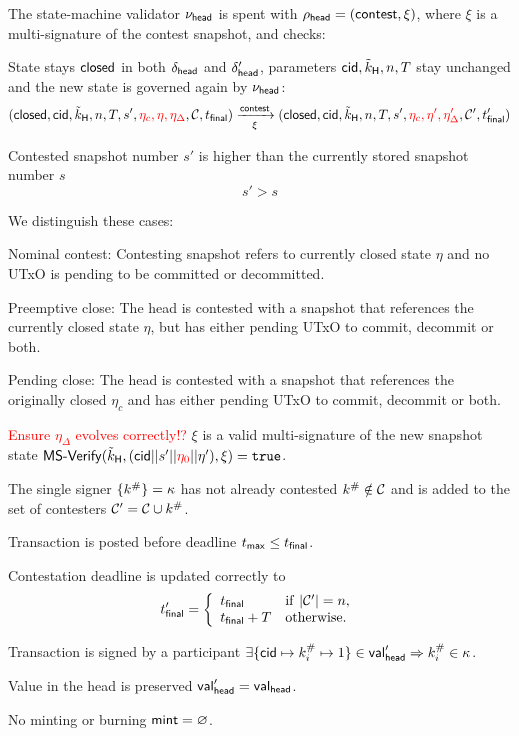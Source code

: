 \noindent The state-machine validator $\nu_\mathsf{head}$ is spent with
$\rho_{\mathsf{head}} = (\mathsf{contest}, \xi)$, where $\xi$ is a multi-signature of
the contest snapshot, and checks:
\begin{menumerate}
	\item State stays $\mathsf{closed}$ in both $\delta_{\mathsf{head}}$ and $\delta_{\mathsf{head}}'$,
	parameters $\mathsf{cid},\tilde{k}_{\mathsf{H}},n,T$ stay
	unchanged and the new state is governed again by $\nu_\mathsf{head}$:
	\[
		(\mathsf{closed},\mathsf{cid},\tilde{k}_{\mathsf{H}},n,T,s',\textcolor{red}{\eta_{c},\eta,\eta_{\Delta}},\mathcal{C},t_{\mathsf{final}}) \xrightarrow[\xi]{\mathsf{contest}} (\mathsf{closed},\mathsf{cid},\tilde{k}_{\mathsf{H}},n,T,s',\textcolor{red}{\eta_{c},\eta',\eta_{\Delta}'},\mathcal{C}',t_{\mathsf{final}}')
	\]

	\item Contested snapshot number $s'$ is higher than the currently stored snapshot number $s$
	\[
		s' > s
	\]
	\item We distinguish these cases: 

	\begin{menumerate}
	  \item Nominal contest: Contesting snapshot refers to currently closed state $\eta$ and no UTxO is pending to be committed or decommitted.
	  \item Preemptive close: The head is contested with a snapshot that references the currently closed state $\eta$, but has either pending UTxO to commit, decommit or both.
	  \item Pending close: The head is contested with a snapshot that references the originally closed $\eta_{c}$ and has either pending UTxO to commit, decommit or both.
	\end{menumerate}




	\textcolor{red}{Ensure $\eta_{\Delta}$ evolves correctly!?} $\xi$ is a valid multi-signature of the new snapshot state
	$\mathsf{MS\textsf{-}{}Verify}(\tilde{k}_{\mathsf{H}},(\mathsf{cid} || s' || \textcolor{red}{\eta_{0}} || \eta'),\xi) = \mathtt{true}$. 

	\item The single signer $\{k^{\#}\} = \kappa$ has not already contested
	$k^{\#} \notin \mathcal{C}$ and is added to the set of contesters
	$\mathcal{C}' = \mathcal{C} \cup k^{\#}$.
	\item Transaction is posted before deadline $t_{\mathsf{max}} \leq t_{\mathsf{final}}$.
	\item Contestation deadline is updated correctly to
	\[
		t_{\mathsf{final}}' = \left\{\begin{array}{ll}
			t_{\mathsf{final}}     & \mathrm{if} ~ |\mathcal{C}'| = n, \\
			t_{\mathsf{final}} + T & \mathrm{otherwise.}
		\end{array}\right.
	\]
	\item Transaction is signed by a participant
	$\exists \{\mathsf{cid} \mapsto k^{\#}_{i} \mapsto 1\} \in \mathsf{val}_{\mathsf{head}}' \Rightarrow k^{\#}_{i} \in \kappa$.
	\item Value in the head is preserved $\mathsf{val}_{\mathsf{head}}' = \mathsf{val}_{\mathsf{head}}$.
	\item No minting or burning $\mathsf{mint} = \varnothing$.
\end{menumerate}

